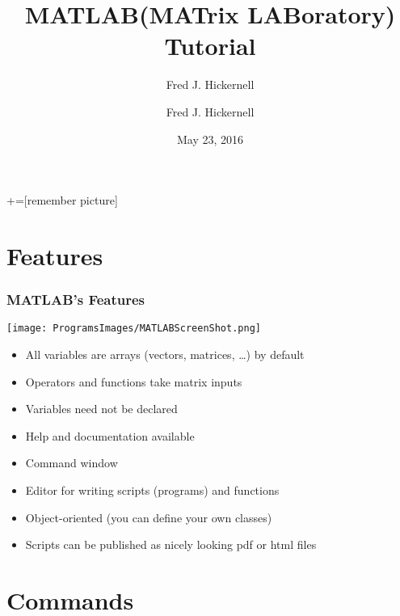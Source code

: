 \documentclass[12pt, compress,xcolor={usenames,dvipsnames}]{beamer} %
\newcommand{\Matlab}{MATLAB\xspace}
\begin{document}
	+=[remember picture]
	\everymath{\displaystyle}
	
	\title[Illinois Institute of Technology]{\Matlab (MATrix LABoratory) Tutorial}
	\author[Fred J. Hickernell]{Fred J. Hickernell}
\author{Fred J. Hickernell}
	\date[May 23, 2016]{May 23, 2016}
	\frame[label=title]{\titlepage}
	
	\section{Features}
	\begin{frame}\frametitle{\Matlab's Features}
		
		\centerline{\texttt{[image: ProgramsImages/MATLABScreenShot.png]}}
		\begin{itemize}
						
			\item All variables are arrays (vectors, matrices, \ldots) by default
			
			\item Operators and functions take matrix inputs
			
			\item Variables need not be declared
			
			\item Help and documentation available
			
			\item Command window
			
			\item Editor for writing scripts (programs) and functions
			
			\item Object-oriented (you can define your own classes)
			
			\item Scripts can be published as nicely looking pdf or html files
			
		\end{itemize}
		
	\end{frame}

\section{Commands}
	
\end{document}
